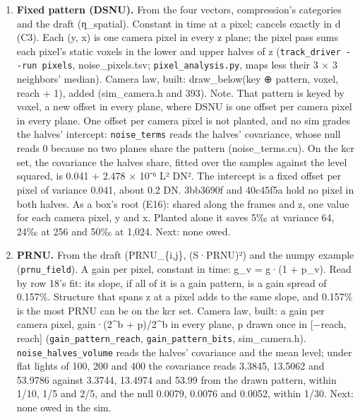 \begin{enumerate}
\item \textbf{Fixed pattern (DSNU).} From the four vectors, compression's categories and the draft (η\_\allowbreak{}spatial). Constant in time at a pixel; cancels exactly in d (C3). Each (y, x) is one camera pixel in every z plane; the pixel pass sums each pixel's static voxels in the lower and upper halves of z (\texttt{track\_\allowbreak{}driver -\allowbreak{}-\allowbreak{}run pixels}, noise\_\allowbreak{}pixels.tsv; \texttt{pixel\_\allowbreak{}analysis.\allowbreak{}py}, maps less their 3 × 3 neighbors' median). Camera law, built: draw\_\allowbreak{}below(key ⊕ pattern, voxel, reach + 1), added (sim\_\allowbreak{}camera.h and 393). Note. That pattern is keyed by voxel, a new offset in every plane, where DSNU is one offset per camera pixel in every plane. One offset per camera pixel is not planted, and no sim grades the halves' intercept: \texttt{noise\_\allowbreak{}terms} reads the halves' covariance, whose null reads 0 because no two planes share the pattern (noise\_\allowbreak{}terms.cu). On the kcr set, the covariance the halves share, fitted over the samples against the level squared, is 0.041 + 2.478 × 10⁻⁶ L² DN². The intercept is a fixed offset per pixel of variance 0.041, about 0.2 DN. 3bb3690f and 40c45f5a hold no pixel in both halves. As a box's root (E16): shared along the frames and z, one value for each camera pixel, y and x. Planted alone it saves 5‰ at variance 64, 24‰ at 256 and 50‰ at 1,024. Next: none owed.
\item \textbf{PRNU.} From the draft (PRNU\_\allowbreak{}\{i,j\}, (S·PRNU)²) and the numpy example (\texttt{prnu\_\allowbreak{}field}). A gain per pixel, constant in time: g\_\allowbreak{}v = g·(1 + p\_\allowbreak{}v). Read by row 18's fit: its slope, if all of it is a gain pattern, is a gain spread of 0.157\%. Structure that spans z at a pixel adds to the same slope, and 0.157\% is the most PRNU can be on the kcr set. Camera law, built: a gain per camera pixel, gain·(2\textasciicircum{}b + p)/2\textasciicircum{}b in every plane, p drawn once in [−reach, reach] (\texttt{gain\_\allowbreak{}pattern\_\allowbreak{}reach}, \texttt{gain\_\allowbreak{}pattern\_\allowbreak{}bits}, sim\_\allowbreak{}camera.h). \texttt{noise\_\allowbreak{}halves\_\allowbreak{}volume} reads the halves' covariance and the mean level; under flat lights of 100, 200 and 400 the covariance reads 3.3845, 13.5062 and 53.9786 against 3.3744, 13.4974 and 53.99 from the drawn pattern, within 1/10, 1/5 and 2/5, and the null 0.0079, 0.0076 and 0.0052, within 1/30. Next: none owed in the sim.


\end{enumerate}
